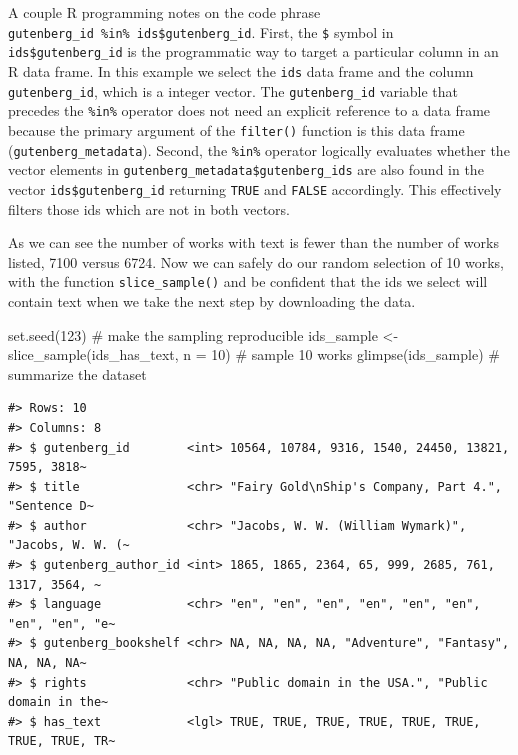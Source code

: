 \documentclass[
  letterpaper,
]{latex/krantz}
\newenvironment{Shaded}{\begin{snugshade}}{\end{snugshade}}
\newcommand{\AttributeTok}[1]{\textcolor[rgb]{0.40,0.45,0.13}{#1}}
\newcommand{\CommentTok}[1]{\textcolor[rgb]{0.37,0.37,0.37}{#1}}
\newcommand{\DecValTok}[1]{\textcolor[rgb]{0.68,0.00,0.00}{#1}}
\newcommand{\FunctionTok}[1]{\textcolor[rgb]{0.28,0.35,0.67}{#1}}
\newcommand{\NormalTok}[1]{\textcolor[rgb]{0.00,0.23,0.31}{#1}}
\newcommand{\OtherTok}[1]{\textcolor[rgb]{0.00,0.23,0.31}{#1}}
\begin{document}
\begin{tcolorbox}[enhanced jigsaw, opacitybacktitle=0.6, breakable, colframe=quarto-callout-warning-color-frame, arc=.35mm, left=2mm, leftrule=.75mm, title=\textcolor{quarto-callout-warning-color}{\faExclamationTriangle}\hspace{0.5em}{Tip}, opacityback=0, colback=white, toptitle=1mm, rightrule=.15mm, titlerule=0mm, bottomtitle=1mm, bottomrule=.15mm, coltitle=black, colbacktitle=quarto-callout-warning-color!10!white, toprule=.15mm]
A couple R programming notes on the code phrase
\texttt{gutenberg\_id\ \%in\%\ ids\$gutenberg\_id}. First, the
\texttt{\$} symbol in \texttt{ids\$gutenberg\_id} is the programmatic
way to target a particular column in an R data frame. In this example we
select the \texttt{ids} data frame and the column
\texttt{gutenberg\_id}, which is a integer vector. The
\texttt{gutenberg\_id} variable that precedes the \texttt{\%in\%}
operator does not need an explicit reference to a data frame because the
primary argument of the \texttt{filter()} function is this data frame
(\texttt{gutenberg\_metadata}). Second, the \texttt{\%in\%} operator
logically evaluates whether the vector elements in
\texttt{gutenberg\_metadata\$gutenberg\_ids} are also found in the
vector \texttt{ids\$gutenberg\_id} returning \texttt{TRUE} and
\texttt{FALSE} accordingly. This effectively filters those ids which are
not in both vectors.
\end{tcolorbox}

As we can see the number of works with text is fewer than the number of
works listed, 7100 versus 6724. Now we can safely do our random
selection of 10 works, with the function \texttt{slice\_sample()} and be
confident that the ids we select will contain text when we take the next
step by downloading the data.

\begin{Shaded}
\begin{Highlighting}[]
\FunctionTok{set.seed}\NormalTok{(}\DecValTok{123}\NormalTok{) }\CommentTok{\# make the sampling reproducible}
\NormalTok{ids\_sample }\OtherTok{\textless{}{-}} \FunctionTok{slice\_sample}\NormalTok{(ids\_has\_text, }\AttributeTok{n =} \DecValTok{10}\NormalTok{) }\CommentTok{\# sample 10 works}
\FunctionTok{glimpse}\NormalTok{(ids\_sample) }\CommentTok{\# summarize the dataset}
\end{Highlighting}
\end{Shaded}

\begin{verbatim}
#> Rows: 10
#> Columns: 8
#> $ gutenberg_id        <int> 10564, 10784, 9316, 1540, 24450, 13821, 7595, 3818~
#> $ title               <chr> "Fairy Gold\nShip's Company, Part 4.", "Sentence D~
#> $ author              <chr> "Jacobs, W. W. (William Wymark)", "Jacobs, W. W. (~
#> $ gutenberg_author_id <int> 1865, 1865, 2364, 65, 999, 2685, 761, 1317, 3564, ~
#> $ language            <chr> "en", "en", "en", "en", "en", "en", "en", "en", "e~
#> $ gutenberg_bookshelf <chr> NA, NA, NA, NA, "Adventure", "Fantasy", NA, NA, NA~
#> $ rights              <chr> "Public domain in the USA.", "Public domain in the~
#> $ has_text            <lgl> TRUE, TRUE, TRUE, TRUE, TRUE, TRUE, TRUE, TRUE, TR~
\end{verbatim}
\end{document}
